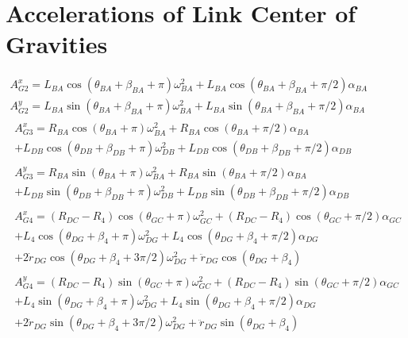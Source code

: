 \documentclass[hidelinks]{article}
\begin{document}
    \FloatBarrier\section*{Accelerations of Link Center of Gravities}
    \begin{gather}
        A_{G2}^{x}=L_{BA}\cos(\theta_{BA}+\beta_{BA}+\pi)\omega_{BA}^{2}+L_{BA}\cos(\theta_{BA}+\beta_{BA}+\pi/2)\alpha_{BA} \\
        A_{G2}^{y}=L_{BA}\sin(\theta_{BA}+\beta_{BA}+\pi)\omega_{BA}^{2}+L_{BA}\sin(\theta_{BA}+\beta_{BA}+\pi/2)\alpha_{BA} \\
        \begin{split}
            A_{G3}^{x}=R_{BA}\cos(\theta_{BA}+\pi)\omega_{BA}^{2}+R_{BA}\cos(\theta_{BA}+\pi/2)\alpha_{BA} \\
            +L_{DB}\cos(\theta_{DB}+\beta_{DB}+\pi)\omega_{DB}^{2}+L_{DB}\cos(\theta_{DB}+\beta_{DB}+\pi/2)\alpha_{DB}
        \end{split} \\
        \begin{split}
            A_{G3}^{y}=R_{BA}\sin(\theta_{BA}+\pi)\omega_{BA}^{2}+R_{BA}\sin(\theta_{BA}+\pi/2)\alpha_{BA} \\
            +L_{DB}\sin(\theta_{DB}+\beta_{DB}+\pi)\omega_{DB}^{2}+L_{DB}\sin(\theta_{DB}+\beta_{DB}+\pi/2)\alpha_{DB}
        \end{split} \\
        \begin{split}
            A_{G4}^{x}=(R_{DC}-R_{4})\cos(\theta_{GC}+\pi)\omega_{GC}^{2}+(R_{DC}-R_{4})\cos(\theta_{GC}+\pi/2)\alpha_{GC} \\
            +L_{4}\cos(\theta_{DG}+\beta_{4}+\pi)\omega_{DG}^{2}+L_{4}\cos(\theta_{DG}+\beta_{4}+\pi/2)\alpha_{DG} \\
            +2\dot{r}_{DG}\cos(\theta_{DG}+\beta_{4}+3\pi/2)\omega_{DG}^{2}+\ddot{r}_{DG}\cos(\theta_{DG}+\beta_{4})
        \end{split} \\
        \begin{split}
            A_{G4}^{y}=(R_{DC}-R_{4})\sin(\theta_{GC}+\pi)\omega_{GC}^{2}+(R_{DC}-R_{4})\sin(\theta_{GC}+\pi/2)\alpha_{GC} \\
            +L_{4}\sin(\theta_{DG}+\beta_{4}+\pi)\omega_{DG}^{2}+L_{4}\sin(\theta_{DG}+\beta_{4}+\pi/2)\alpha_{DG} \\
            +2\dot{r}_{DG}\sin(\theta_{DG}+\beta_{4}+3\pi/2)\omega_{DG}^{2}+\ddot{r}_{DG}\sin(\theta_{DG}+\beta_{4})

\end{split}
\end{gather}
\end{document}
